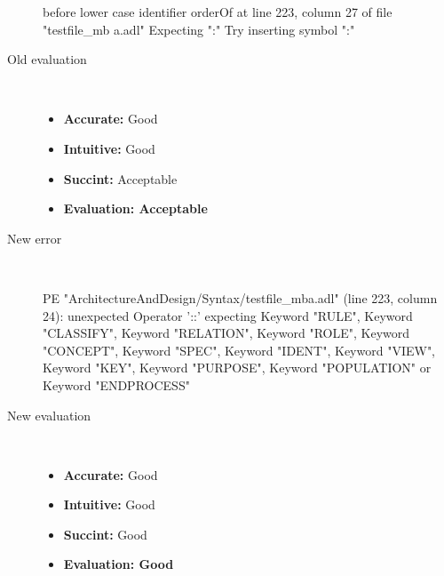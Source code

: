 \begin{description}
\begin{haskell}
before lower case identifier orderOf at line 223, column 27 of file "testfile_mb
a.adl"
Expecting ":"
Try inserting symbol ":"\end{haskell}
  \item[Old evaluation]~\\
    \begin{itemize}
    \item \textbf{Accurate:} Good
    \item \textbf{Intuitive:} Good
    \item \textbf{Succint:} Acceptable
    \item \textbf{Evaluation: Acceptable}
    \end{itemize}
  \item[New error]~\\
\begin{haskell}
PE "ArchitectureAndDesign/Syntax/testfile_mba.adl" (line 223, column 24):
unexpected Operator '::'
expecting Keyword "RULE", Keyword "CLASSIFY", Keyword "RELATION", Keyword "ROLE", Keyword "CONCEPT", Keyword "SPEC", Keyword "IDENT", Keyword "VIEW", Keyword "KEY", Keyword "PURPOSE", Keyword "POPULATION" or Keyword "ENDPROCESS"\end{haskell}
  \item[New evaluation]~\\
    \begin{itemize}
    \item \textbf{Accurate:} Good
    \item \textbf{Intuitive:} Good
    \item \textbf{Succint:} Good
    \item \textbf{Evaluation: Good
}
    \end{itemize}
  \end{description}

\hrulefill

